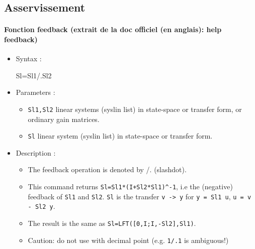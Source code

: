 \subsection{Asservissement}
\begin{doc}
\paragraph{Fonction feedback (extrait de la doc officiel (en anglais): 
           help feedback)}
\begin{itemize}
    \item Syntax :
    \begin{Scilabcode}
Sl=Sl1/.Sl2
    \end{Scilabcode}
    \item Parameters :
    \begin{itemize}
        \item \verb?Sl1,Sl2?  linear systems (syslin list) in state-space or 
              transfer form, or ordinary gain matrices.
        \item \verb?Sl? linear system (syslin list) in state-space or 
              transfer form.
    \end{itemize}
    \item Description :
    \begin{itemize} 
        \item The feedback operation is denoted by /. (slashdot). 
        \item This command returns \verb?Sl=Sl1*(I+Sl2*Sl1)^-1?, i.e 
              the (negative) feedback of \verb?Sl1? and \verb?Sl2?. \verb?Sl? 
              is the transfer \verb?v -> y? for 
              \verb?y = Sl1 u?, \verb?u = v - Sl2 y?.
        \item The result is the same as \verb?Sl=LFT([0,I;I,-Sl2],Sl1)?.
        \item Caution: do not use with decimal point (e.g. \verb?1/.1? 
              is ambiguous!)
    \end{itemize}
\end{itemize}
\end{doc}
